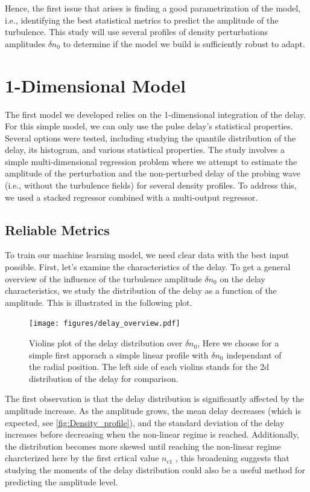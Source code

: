 \documentclass[11pt,a4paper,openany]{report}
\begin{document}
\begin{multicols}{2}
    Hence, the first issue that arises is finding a good parametrization of the model, i.e., identifying the best statistical metrics to predict the amplitude of the turbulence. This study will use several profiles of density perturbations amplitudes $\delta n_0$ to determine if the model we build is sufficiently robust to adapt.

    \chapter{1-Dimensional Model}

    The first model we developed relies on the 1-dimensional integration of the delay. For this simple model, we can only use the pulse delay's statistical properties. Several options were tested, including studying the quantile distribution of the delay, its histogram, and various statistical properties. The study involves a simple multi-dimensional regression problem where we attempt to estimate the amplitude of the perturbation and the non-perturbed delay of the probing wave (i.e., without the turbulence fields) for several density profiles. To address this, we used a stacked regressor combined with a multi-output regressor.

    \section{Reliable Metrics}

    To train our machine learning model, we need clear data with the best input possible. First, let's examine the characteristics of the delay. To get a general overview of the influence of the turbulence amplitude $\delta n_0$ on the delay characteristics, we study the distribution of the delay as a function of the amplitude. This is illustrated in the following plot.

    \begin{figure}[H]
        \centering
        \texttt{[image: figures/delay\_overview.pdf]}
        \caption{Violins plot of the delay distribution over $\delta n_0$, Here we choose for a simple first apporach a simple linear profile with $\delta n_0$ independant of the radial position. The left side of each violins stands for the 2d distribution of the delay for comparison.}
        \label{fig:Violins_delay}
    \end{figure}
    The first observation is that the delay distribution is significantly affected by the amplitude increase. As the amplitude grows, the mean delay decreases (which is expected, see \ref{fig:Density_profile}), and the standard deviation of the delay increases before decreasing when the non-linear regime is reached. Additionally, the distribution becomes more skewed until reaching the non-linear regime charcterized here by the first crtical value $n_{c1}$ , this broadening suggests that studying the moments of the delay distribution could also be a useful method for predicting the amplitude level.


\end{multicols}
\end{document}
